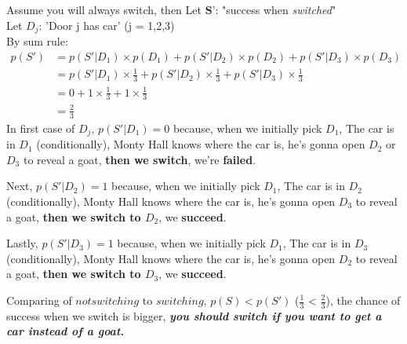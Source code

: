 \documentclass{article}
\begin{document}
    Assume you will always switch, then Let $\textbf{S'}$: "success when \textit{switched}" \\
    Let $D_j$: 'Door j has car' (j = {1,2,3}) \\
    
    By sum rule:
    \begin{equation}
        \begin{split}
        p(S') & = p(S'|D_1)\times p(D_1) + p(S'|D_2)\times p(D_2) + p(S'|D_3)\times p(D_3) \\
              & = p(S'|D_1)\times \frac{1}{3} + p(S'|D_2)\times \frac{1}{3} + p(S'|D_3)\times \frac{1}{3} \\
              & = 0 + 1 \times \frac{1}{3} + 1 \times \frac{1}{3} \\
              & = \frac{2}{3}
        \end{split}
    \end{equation}
In first case of $D_j$, \textit{$ p(S'|D_1) = 0$} because, when we initially pick $D_1$, The car is in $D_1$ (conditionally), Monty Hall knows where the car is, he's gonna open $D_2$ or $D_3$ to reveal a goat, \textbf{then we switch}, we're \textbf{failed}.

Next, \textit{$ p(S'|D_2) = 1$} because, when we initially pick $D_1$, The car is in $D_2$ (conditionally), Monty Hall knows where the car is, he's gonna open $D_3$ to reveal a goat, \textbf{then we switch to $D_2$}, we \textbf{succeed}.

Lastly, \textit{$ p(S'|D_3) = 1$} because, when we initially pick $D_1$, The car is in $D_3$ (conditionally), Monty Hall knows where the car is, he's gonna open $D_2$ to reveal a goat, \textbf{then we switch to $D_3$}, we \textbf{succeed}.
    
Comparing of $not switching$ to $switching$, $p(S) < p(S')$ ($\frac{1}{3}$ < $\frac{2}{3}$), the chance of success when we switch is bigger, \textbf{\textit{you should switch if you want to get a car instead of a goat. }}
\end{document}

